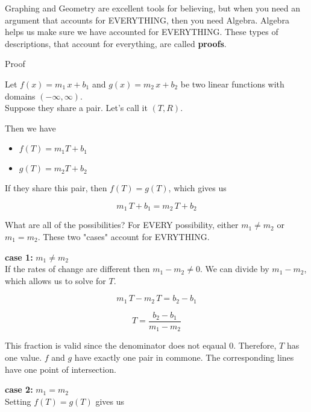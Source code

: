 \documentclass{ximera}
\begin{document}
Graphing and Geometry are excellent tools for believing, but when you need an argument that accounts for EVERYTHING, then you need Algebra.  Algebra helps us make sure we have accounted for EVERYTHING.  These types of descriptions, that account for everything, are called \textbf{proofs}.














\begin{explanation} Proof 


Let $f(x) = m_1 \, x + b_1$ and $g(x) = m_2 \, x + b_2$ be two linear functions with domains $(-\infty, \infty)$. \\
Suppose they share a pair. Let's call it $(T, R)$.

Then we have 

\begin{itemize}
\item $f(T) = m_1 T + b_1$
\item $g(T) = m_2 T + b_2$
\end{itemize}

If they share this pair, then $f(T) = g(T)$, which gives us

\[     m_1 \, T + b_1 =  m_2 \, T + b_2  \]


What are all of the possibilities?  For EVERY possibility, either $m_1 \ne m_2$ or $m_1 = m_2$.  These two "cases" account for EVRYTHING.


\textbf{case 1:}  $m_1 \ne m_2$ \\

If the rates of change are different then  $m_1 - m_2 \ne 0$.  We can divide by $m_1 - m_2$, which allows us to solve for $T$.

\[     m_1 \, T - m_2 \, T =  b_2 -b_1 \]


\[     T =  \frac{b_2 -b_1}{m_1 - m_2}  \]

This fraction is valid since the denominator does not eqaual $0$.  Therefore, $T$ has one value.  $f$ and $g$ have exactly one pair in commone.  The corresponding lines have one point of intersection.



\textbf{case 2:}  $m_1 = m_2$ \\



Setting $f(T) = g(T)$ gives us 




\end{explanation}
\end{document}
